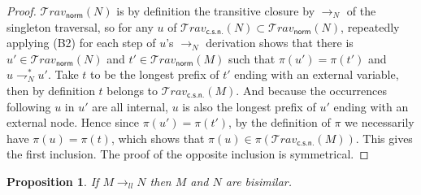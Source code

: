 \documentclass[xchauthor,chkrefs,GCNS,amsmath,amsthm,rotating,leaveRGB]{tcsg}
\theoremstyle{plain}
\newtheorem{proposition}[theorem]{Proposition}
\theoremstyle{definition}
\def\internalextension{\rightharpoondown}
\newcommand\travset{\mathcal{T}\!rav}
\newcommand{\normalizing}{\mathsf{norm}}
\newcommand{\travsetnorm}{\travset_{\normalizing}}
\newcommand{\travsetscn}{\travset_{\mathsf{c.s.n.}}}
\def\coresymbol{\pi}
\newcommand{\core}[1]{\coresymbol(#1)}
\newcommand{\llred}{\rightarrow_{ll}}
\begin{document}
\begin{proof}
$\travsetnorm (N)$ is by definition the transitive closure by $\rightarrow
_{N}$ of the singleton traversal, so for any $u$ of $\travsetscn (N) \subset
\travsetnorm (N)$, repeatedly applying (B2) for each step of $u$'s
$\rightarrow _{N}$ derivation shows that there is $u' \in \travsetnorm (N)$
and  $t' \in \travsetnorm (M)$ such that $\core{u'} = \core{t'}$ and $u
\internalextension _{N}^{*} u'$. Take $t$ to be the longest prefix of $t'$
ending with an external variable, then by definition $t$ belongs to
$\travsetscn (M)$. And because the occurrences following $u$ in $u'$ are all
internal, $u$ is also the longest prefix of $u'$ ending with an external
node. Hence since $\core{u'} = \core{t'}$, by the definition of $\coresymbol
$ we necessarily have $\core{u} = \core{t}$, which shows that $\core{u}\in
\core{\travsetscn (M)}$. This gives the first inclusion. The proof of the
opposite inclusion is symmetrical.
\end{proof}

\begin{proposition}\label{prop:ulctrav_impl_linear_reduction}
If $M \llred N$ then $M$ and $N$ are bisimilar.
\end{proposition}
\end{document}
